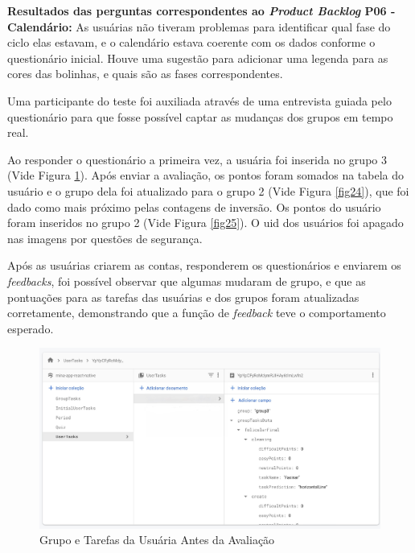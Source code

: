 \textbf{Resultados das perguntas correspondentes ao \emph{Product Backlog} P06 - Calendário:} As usuárias não tiveram problemas 
para identificar qual fase do ciclo elas estavam, e o calendário estava coerente com os dados conforme o questionário inicial.
Houve uma sugestão para adicionar uma legenda para as cores das bolinhas, e quais são as fases correspondentes. 

Uma participante do teste foi auxiliada através de uma entrevista guiada pelo 
questionário para que fosse possível captar as mudanças dos grupos em tempo real. 

Ao responder o questionário a primeira vez, a usuária foi inserida no grupo 3 (Vide Figura \ref{fig23}). 
Após enviar a avaliação, os pontos foram somados 
na tabela do usuário e o grupo dela foi atualizado para o grupo 2 (Vide Figura \ref{fig24}), 
que foi dado como mais próximo pelas contagens de inversão. 
Os pontos do usuário foram inseridos no grupo 2 (Vide Figura \ref{fig25}). O uid dos usuários foi apagado nas 
imagens por questões de segurança.

Após as usuárias criarem as contas, responderem os questionários e enviarem os \emph{feedbacks}, foi possível observar que algumas 
mudaram de grupo, e que as pontuações para as tarefas das usuárias e dos grupos foram atualizadas corretamente, demonstrando que 
a função de \emph{feedback} teve o comportamento esperado. 

\begin{figure}[htbp]
	\caption{Grupo e Tarefas da Usuária Antes da Avaliação}
	\begin{center}
	\includegraphics[keepaspectratio=true,scale=0.18]{figuras/db1.jpeg}
	\end{center}
    \label{fig23}
\end{figure}

